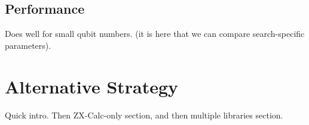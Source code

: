 

\subsection{Performance}




Does well for small qubit numbers. (it is here that we can compare search-specific parameters).

\section{Alternative Strategy}

Quick intro. Then ZX-Calc-only section, and then multiple libraries section.
